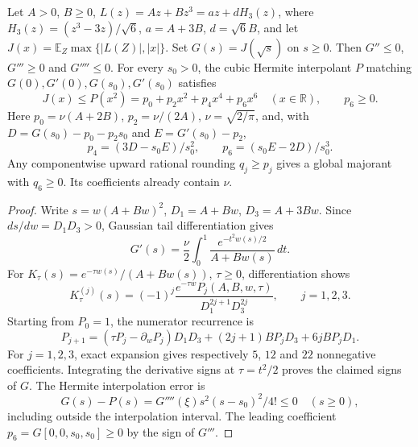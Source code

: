 \begin{proposition}\label{prop:contact-head-source}
Let $A>0$, $B\ge0$, $L(z)=Az+Bz^3=a z+dH_3(z)$, where
$H_3(z)=(z^3-3z)/\sqrt6$, $a=A+3B$, $d=\sqrt6B$, and let
$J(x)=\mathbb E_Z\max\{|L(Z)|,|x|\}$.
Set $G(s)=J(\sqrt s)$ on $s\ge0$.  Then
$G''\le0$, $G'''\ge0$ and $G''''\le0$.
For every $s_0>0$, the cubic Hermite interpolant $P$ matching
$G(0),G'(0),G(s_0),G'(s_0)$ satisfies
\[
 J(x)\le P(x^2)=p_0+p_2x^2+p_4x^4+p_6x^6
 \quad(x\in\mathbb R),\qquad p_6\ge0.
\]
Here $p_0=\nu(A+2B)$, $p_2=\nu/(2A)$, $\nu=\sqrt{2/\pi}$, and, with
$D=G(s_0)-p_0-p_2s_0$ and $E=G'(s_0)-p_2$,
\[
 p_4=(3D-s_0E)/s_0^2,\qquad p_6=(s_0E-2D)/s_0^3.
\]
Any componentwise upward rational rounding $q_j\ge p_j$ gives a global
majorant with $q_6\ge0$.  Its coefficients already contain $\nu$.
\end{proposition}
\begin{proof}
Write $s=w(A+Bw)^2$, $D_1=A+Bw$, $D_3=A+3Bw$.
Since $ds/dw=D_1D_3>0$, Gaussian tail differentiation gives
\[
 G'(s)=\frac\nu2\int_0^1
       \frac{e^{-t^2w(s)/2}}{A+Bw(s)}\,dt.
\]
For $K_\tau(s)=e^{-\tau w(s)}/(A+Bw(s))$, $\tau\ge0$, differentiation
shows
\[
 K_\tau^{(j)}(s)=(-1)^j
  \frac{e^{-\tau w}P_j(A,B,w,\tau)}{D_1^{2j+1}D_3^{2j}},\qquad j=1,2,3.
\]
Starting from $P_0=1$, the numerator recurrence is
\[
 P_{j+1}=(\tau P_j-\partial_wP_j)D_1D_3
       +(2j+1)BP_jD_3+6jBP_jD_1.
\]
For $j=1,2,3$, exact expansion gives respectively $5$, $12$ and $22$
nonnegative coefficients.  Integrating the derivative signs at
$\tau=t^2/2$ proves the claimed signs of $G$.
The Hermite interpolation error is
\[
 G(s)-P(s)=G''''(\xi)s^2(s-s_0)^2/4!\le0
 \quad(s\ge0),
\]
including outside the interpolation interval.  The leading coefficient
$p_6=G[0,0,s_0,s_0]\ge0$ by the sign of $G'''$.
\end{proof}

